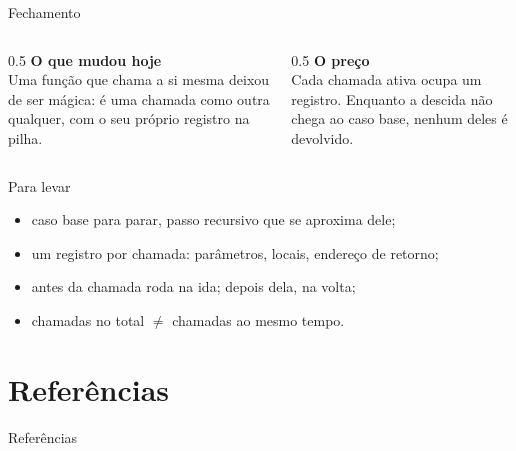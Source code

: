 \documentclass[aspectratio=169]{beamer}
\begin{document}
\begin{frame}{Fechamento}
  \begin{columns}[T]
    \begin{column}{0.5\textwidth}
      \textbf{O que mudou hoje}\\[0.3em]
      \small Uma função que chama a si mesma deixou de ser mágica: é uma
      chamada como outra qualquer, com o seu próprio registro na pilha.
    \end{column}
    \begin{column}{0.5\textwidth}
      \textbf{O preço}\\[0.3em]
      \small Cada chamada ativa ocupa um registro. Enquanto a descida não
      chega ao caso base, nenhum deles é devolvido.
    \end{column}
  \end{columns}
  \begin{block}{Para levar}
    \begin{itemize}
      \small
      \item caso base para parar, passo recursivo que se aproxima dele;
      \item um registro por chamada: parâmetros, locais, endereço de
        retorno;
      \item antes da chamada roda na ida; depois dela, na volta;
      \item chamadas no total $\neq$ chamadas ao mesmo tempo.
    \end{itemize}
  \end{block}
\end{frame}

\section*{Referências}
\begin{frame}[allowframebreaks]{Referências}
  
  
\end{frame}
\end{document}
